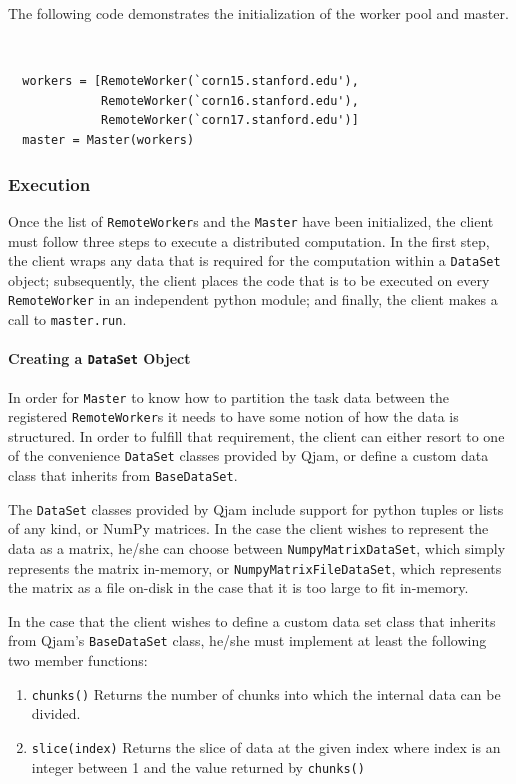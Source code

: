 \documentclass[%
  final,
  notitlepage,
  narroweqnarray,
  inline,
]{ieee}
\begin{document}
The following code demonstrates the initialization of the worker pool and
master.

{\tt \small
\begin{verbatim}
  workers = [RemoteWorker(`corn15.stanford.edu'),
             RemoteWorker(`corn16.stanford.edu'),
             RemoteWorker(`corn17.stanford.edu')]
  master = Master(workers)
\end{verbatim}}

\subsubsection{Execution}

Once the list of \texttt{RemoteWorker}s and the \texttt{Master} have been
initialized, the client must follow three steps to execute a distributed
computation. In the first step, the client wraps any data that is required for
the computation within a \texttt{DataSet} object; subsequently, the client
places the code that is to be executed on every \texttt{RemoteWorker} in an
independent python module; and finally, the client makes a call to
\texttt{master.run}.

\paragraph{Creating a \texttt{DataSet} Object}
\label{DataSets}

In order for \texttt{Master} to know how to partition the task data between the
registered \texttt{RemoteWorker}s it needs to have some notion of how the data
is structured. In order to fulfill that requirement, the client can either
resort to one of the convenience \texttt{DataSet} classes provided by Qjam, or
define a custom data class that inherits from \texttt{BaseDataSet}.

The \texttt{DataSet} classes provided by Qjam include support for python tuples
or lists of any kind, or NumPy matrices. In the case the client wishes to
represent the data as a matrix, he/she can choose between
\texttt{NumpyMatrixDataSet}, which simply represents the matrix in-memory, or
\texttt{NumpyMatrixFileDataSet}, which represents the matrix as a file on-disk
in the case that it is too large to fit in-memory.

In the case that the client wishes to define a custom data set class that
inherits from Qjam's \texttt{BaseDataSet} class, he/she must implement at least
the following two member functions:
\begin{enumerate}
  \item
    \texttt{chunks()}
    Returns the number of chunks into which the internal data can be divided.
  \item
    \texttt{slice(index)}
    Returns the slice of data at the given index where index is an integer
    between 1 and the value returned by \texttt{chunks()}
\end{enumerate}
\end{document}
